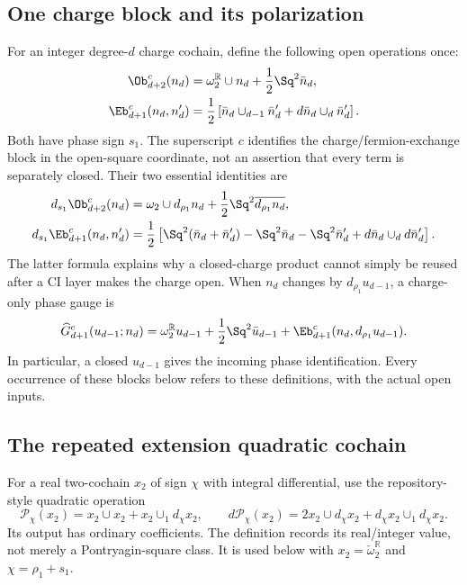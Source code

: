 \subsection{One charge block and its polarization}\label{subsec:CFblocks}
For an integer degree-$d$ charge cochain, define the following open operations once:
\begin{align}
 \Ob^c_{d+2}(n_d)
 &=\omega_2^{\mathbb R}\cup n_d+\frac12\Sq^2\bar n_d,
 \label{eq:CF-source}\\
 \Eb^c_{d+1}(n_d,n'_d)
 &=\frac12\left[\bar n_d\cup_{d-1}\bar n'_d
                 +d\bar n_d\cup_d\bar n'_d\right].
 \label{eq:CF-product}
\end{align}
Both have phase sign $s_1$. The superscript $c$ identifies the charge/fermion-exchange block in the open-square coordinate, not an assertion that every term is separately closed. Their two essential identities are
\begin{align}
 d_{s_1}\Ob^c_{d+2}(n_d)
 &=\omega_2\cup d_{\rho_1}n_d
   +\frac12\Sq^2\overline{d_{\rho_1}n_d},\label{eq:CF-residual}\\
 d_{s_1}\Eb^c_{d+1}(n_d,n'_d)
 &=\frac12\left[\Sq^2(\bar n_d+\bar n'_d)
 -\Sq^2\bar n_d-\Sq^2\bar n'_d
 +d\bar n_d\cup_d d\bar n'_d\right].\label{eq:CF-polarization}
\end{align}
The latter formula explains why a closed-charge product cannot simply be reused after a CI layer makes the charge open. When $n_d$ changes by $d_{\rho_1}u_{d-1}$, a charge-only phase gauge is
\begin{equation}\label{eq:CF-gauge}
 \widehat G^c_{d+1}(u_{d-1};n_d)
 =\omega_2^{\mathbb R}u_{d-1}
  +\frac12\Sq^2\bar u_{d-1}
  +\Eb^c_{d+1}(n_d,d_{\rho_1}u_{d-1}).
\end{equation}
In particular, a closed $u_{d-1}$ gives the incoming phase identification. Every occurrence of these blocks below refers to these definitions, with the actual open inputs.

\subsection{The repeated extension quadratic cochain}
For a real two-cochain $x_2$ of sign $\chi$ with integral differential, use the repository-style quadratic operation
\begin{equation}\label{eq:extension-P}
 \mathcal P_\chi(x_2)=x_2\cup x_2+x_2\cup_1d_\chi x_2,
 \qquad
 d\mathcal P_\chi(x_2)=2x_2\cup d_\chi x_2
                         +d_\chi x_2\cup_1d_\chi x_2.
\end{equation}
Its output has ordinary coefficients. The definition records its real/integer value, not merely a Pontryagin-square class. It is used below with $x_2=\check\omega_2^{\mathbb R}$ and $\chi=\rho_1+s_1$.

